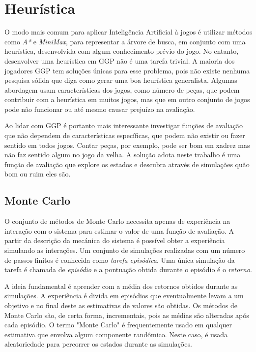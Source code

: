 \chapter{Heurística}
O modo mais comum para aplicar Inteligência Artificial à jogos é utilizar métodos como \textit{A*} e \textit{MiniMax}, para representar a árvore de busca, em conjunto com uma heurística, desenvolvida com algum conhecimento prévio do jogo. No entanto, desenvolver uma heurística em GGP não é uma tarefa trivial. A maioria dos jogadores GGP tem soluções únicas para esse problema, pois não existe nenhuma pesquisa sólida que diga como gerar uma boa heurística generalista. Algumas abordagem usam características dos jogos, como número de peças, que podem contribuir com a heurística em muitos jogos, mas que em outro conjunto de jogos pode não funcionar ou até mesmo causar prejuízo na avaliação.

Ao lidar com GGP é portanto mais interessante investigar funções de avaliação que não dependem de características específicas, que podem não existir ou fazer sentido em todos jogos. Contar peças, por exemplo, pode ser bom em xadrez mas não faz sentido algum no jogo da velha. A solução adota neste trabalho é uma função de avaliação que explore os estados e descubra através de simulações quão bom ou ruim eles são.


\section{Monte Carlo}
O conjunto de métodos de Monte Carlo\cite{rlearning} necessita apenas de experiência na interação com o sistema para estimar o valor de uma função de avaliação. A partir da descrição da mecánica do sistema é possível obter a experiência simulando as interações. Um  conjunto de simulações realizadas com um número de passos finitos é conhecida como \textit{tarefa episódica}. Uma única simulação da tarefa é chamada de \textit{episódio} e a pontuação obtida durante o episódio é o \textit{retorno}. 

A ideia fundamental é aprender com a média dos retornos obtidos durante as simulações. A experiência é divida em episódios que eventualmente levam a um objetivo e no final deste as estimativas de valores são obtidas. Os métodos de Monte Carlo são, de certa forma, incrementais, pois as médias são alteradas após cada episódio. O termo "Monte Carlo" é frequentemente usado em qualquer estimativa que envolva algum componente randômico. Neste caso, é usada aleatoriedade para percorrer os estados durante as simulações.

